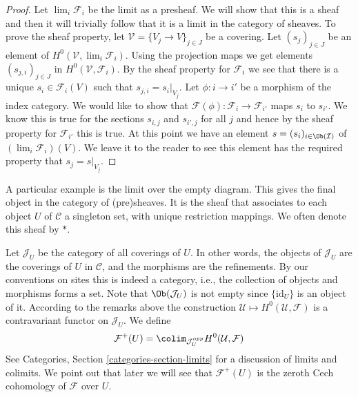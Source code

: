 \begin{proof}
Let $\lim_i \mathcal{F}_i$ be the limit as a presheaf.
We will show that this is a sheaf and then it will trivially follow
that it is a limit in the category of sheaves. To prove the sheaf
property, let $\mathcal{V} = \{V_j \to V\}_{j\in J}$ be a covering.
Let $(s_j)_{j\in J}$ be an element of $H^0(\mathcal{V}, \lim_i \mathcal{F}_i)$.
Using the projection maps we get elements $(s_{j, i})_{j\in J}$
in $H^0(\mathcal{V}, \mathcal{F}_i)$. By the sheaf property for
$\mathcal{F}_i$ we see that there is a unique $s_i \in \mathcal{F}_i(V)$
such that $s_{j, i} = s_i|_{V_j}$. Let $\phi : i \to i'$ be a morphism
of the index category. We would like to show that
$\mathcal{F}(\phi) : \mathcal{F}_i \to \mathcal{F}_{i'}$
maps $s_i$ to $s_{i'}$. We know this is true for the sections
$s_{i, j}$ and $s_{i', j}$ for all $j$ and hence by the sheaf property
for $\mathcal{F}_{i'}$ this is true. At this point we have an
element $s = (s_i)_{i \in \Ob(\mathcal{I})}$ of
$(\lim_i \mathcal{F}_i)(V)$. We leave it to the reader to see
this element has the required property that $s_j = s|_{V_j}$.
\end{proof}

\begin{example}
\label{example-singleton-sheaf}
A particular example is the limit over the empty diagram.
This gives the final object in the category of (pre)sheaves.
It is the sheaf that associates to each object $U$ of $\mathcal{C}$
a singleton set, with unique restriction mappings. We often denote
this sheaf by $*$.
\end{example}

\noindent
Let $\mathcal{J}_U$ be the category of all coverings of $U$.
In other words, the objects of $\mathcal{J}_U$ are the coverings
of $U$ in $\mathcal{C}$, and the morphisms are the refinements.
By our conventions on sites this is indeed a category, i.e.,
the collection of objects and morphisms forms a set.
Note that $\Ob(\mathcal{J}_U)$ is not empty since
$\{\text{id}_U\}$ is an object of it. According to the remarks
above the construction $\mathcal{U} \mapsto H^0(\mathcal{U}, \mathcal{F})$
is a contravariant functor on $\mathcal{J}_U$.
We define
$$
\mathcal{F}^{+}(U)
=
\colim_{\mathcal{J}_U^{opp}}
H^0(\mathcal{U}, \mathcal{F})
$$
See Categories, Section \ref{categories-section-limits} for
a discussion of limits and colimits. We point out that later
we will see that $\mathcal{F}^{+}(U)$ is the zeroth Cech
cohomology of $\mathcal{F}$ over $U$.


